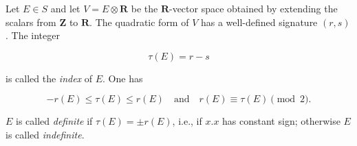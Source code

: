 Let $E \in S$ and let $V = E \otimes \mathbf{R}$ be the $\mathbf{R}$-vector space obtained by extending the scalars from $\mathbf{Z}$ to $\mathbf{R}$. The quadratic form of $V$ has a well-defined signature $(r, s)$. The integer

$$\tau(E) = r - s$$

is called the \emph{index} of $E$. One has

$$-r(E) \leq \tau(E) \leq r(E) \quad \text{and} \quad r(E) \equiv \tau(E) \pmod{2}.$$

$E$ is called \emph{definite} if $\tau(E) = \pm r(E)$, i.e., if $x.x$ has constant sign; otherwise $E$ is called \emph{indefinite}.
